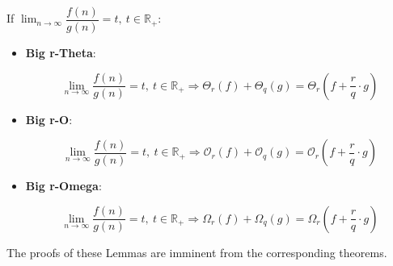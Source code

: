 If $\lim_{n\to\infty} \dfrac{f(n)}{g(n)} = t, \ t \in \mathbb{R}_{+}$:
\begin{itemize}
    \item \textbf{Big r-Theta}:
    \begin{lemma}
        \[ \lim_{n\to\infty} \dfrac{f(n)}{g(n)} = t, \ t \in \mathbb{R}_{+} \Rightarrow \Theta_{r}(f) + \Theta_{q}(g) = \Theta_{r}(f + \dfrac{r}{q} \cdot g)\]
    \end{lemma}
    \item \textbf{Big r-O}:
    \begin{lemma}
        \[ \lim_{n\to\infty} \dfrac{f(n)}{g(n)} = t, \ t \in \mathbb{R}_{+} \Rightarrow \mathcal{O}_{r}(f) + \mathcal{O}_{q}(g) = \mathcal{O}_{r}(f + \dfrac{r}{q} \cdot g)\]
    \end{lemma}
    \item \textbf{Big r-Omega}:
    \begin{lemma}
        \[ \lim_{n\to\infty} \dfrac{f(n)}{g(n)} = t, \ t \in \mathbb{R}_{+} \Rightarrow \Omega_{r}(f) + \Omega_{q}(g) = \Omega_{r}(f + \dfrac{r}{q} \cdot g)\]
    \end{lemma}
\end{itemize}

The proofs of these Lemmas are imminent from the corresponding theorems.